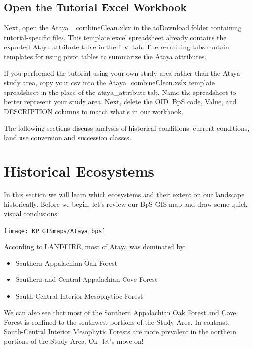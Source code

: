 \documentclass[
]{book}
\providecommand{\tightlist}{%
  \setlength{\itemsep}{0pt}\setlength{\parskip}{0pt}}
\begin{document}
\hypertarget{open-the-tutorial-excel-workbook}{%
\section{Open the Tutorial Excel Workbook}\label{open-the-tutorial-excel-workbook}}

Next, open the Ataya \_combineClean.xlsx in the toDownload folder containing tutorial-specific files. This template excel spreadsheet already contains the exported Ataya attribute table in the first tab. The remaining tabs contain templates for using pivot tables to summarize the Ataya attributes.

If you performed the tutorial using your own study area rather than the Ataya study area, copy your csv into the Ataya\_combineClean.xslx template spreadsheet in the place of the ataya\_attribute tab. Name the spreadsheet to better represent your study area. Next, delete the OID, BpS code, Value, and DESCRIPTION columns to match what's in our workbook.

The following sections discuss analysis of historical conditions, current conditions, land use conversion and succession classes.

\hypertarget{historicalEcosystems}{%
\chapter{Historical Ecosystems}\label{historicalEcosystems}}

In this section we will learn which ecosystems and their extent on our landscape historically. Before we begin, let's review our BpS GIS map and draw some quick visual conclusions:

\texttt{[image: KP\_GISmaps/Ataya\_bps]}

According to LANDFIRE, most of Ataya was dominated by:

\begin{itemize}
\tightlist
\item
  Southern Appalachian Oak Forest
\item
  Southern and Central Appalachian Cove Forest
\item
  South-Central Interior Mesophytioc Forest
\end{itemize}

We can also see that most of the Southern Appalachian Oak Forest and Cove Forest is confined to the southwest portions of the Study Area. In contrast, South-Central Interior Mesophytic Forests are more prevalent in the northern portions of the Study Area. Ok- let's move on!
\end{document}
